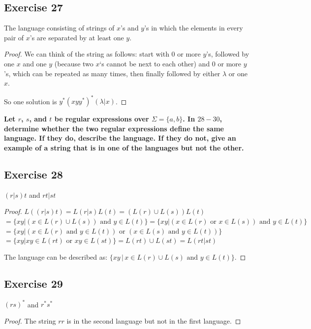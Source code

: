 \documentclass[14pt]{extarticle}
\newcommand{\cy}{\color{cyan}}
\begin{document}
\subsection{Exercise 27}
The language consisting of strings of \(x\)’s and \(y\)’s in which the elements in every pair of \(x\)’s are separated by
at least one \(y\).

\begin{proof}
    We can think of the string as follows: start with 0 or more \(y\)'s, followed by one \(x\) and one \(y\) (because two
    \(x\)`s cannot be next to each other) and 0 or more \(y\)'s,
    which can be repeated as many times, then finally followed by
    either \(\lambda\) or one \(x\).

    So one solution is \(y^*(xyy^*)^*(\lambda | x)\).
\end{proof}

{\bf \cy Let \(r\), \(s\), and \(t\) be regular expressions over \(\Sigma = \{a, b\}\). In \(28-30\), determine whether
the two regular expressions define the same language. If they do, describe the language. If they do not, give an example of
a string that is in one of the languages but not the other.}

\subsection{Exercise 28}
\((r | s)t\) and \(rt | st\)

\begin{proof}
    \(L((r | s)t) = L(r | s)L(t) = (L(r) \cup L(s))L(t)\) \\
    \(= \{xy | (x \in L(r) \cup L(s)) \text{ and } y \in L(t)\}
    = \{xy | (x \in L(r) \text{ or } x \in L(s)) \text{ and } y
    \in L(t)\}\) \\
    \(= \{xy | (x \in L(r) \text{ and } y \in L(t)) \text{ or } (x \in L(s) \text{ and } y \in L(t))\}\) \\
    \(= \{xy | xy \in L(rt) \text{ or } xy \in L(st)\} = L(rt) \cup L(st) = L(rt | st)\)

    The language can be described as: \(\{xy \, | \, x \in L(r) \cup L(s) \text{ and } y \in L(t)\}\).
\end{proof}

\subsection{Exercise 29}
\((rs)^*\) and \(r^*s^*\)

\begin{proof}
    The string \(rr\) is in the second language but not in the first language.
\end{proof}
\end{document}
